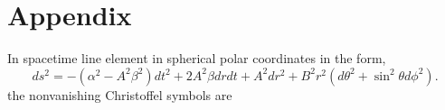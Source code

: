 \section*{Appendix}

In spacetime line element in spherical polar coordinates in the form,
\begin{equation}
	ds^2 = - (\alpha^2 - A^2 \beta^2) dt^2 + 2A^2 \beta drdt + A^2 dr^2 + B^2r^2 (d\theta^2 + \sin^2 \theta d\phi^2).
\end{equation}
the nonvanishing Christoffel symbols are

